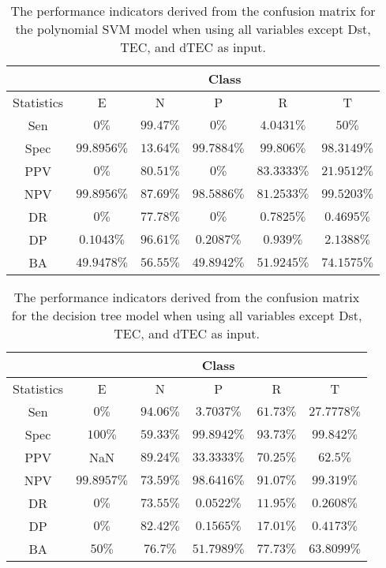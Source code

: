 \begin{table}[!ht]
	\centering
	\begin{tabular}{|c|c|c|c|c|c|}
		\hline
		 & \multicolumn{5}{c|}{Class} \\ \hline
		Statistics & E & N & P & R & T \\ \hline
		Sen & $0\%$ & $99.47\%$ & $0\%$ & $4.0431\%$ & $50\%$ \\ \hline
		Spec & $99.8956\%$ & $13.64\%$ & $99.7884\%$ & $99.806\%$ & $98.3149\%$ \\ \hline
		PPV & $0\%$ & $80.51\%$ & $0\%$ & $83.3333\%$ & $21.9512\%$ \\ \hline
		NPV & $99.8956\%$ & $87.69\%$ & $98.5886\%$ & $81.2533\%$ & $99.5203\%$ \\ \hline
		DR & $0\%$ & $77.78\%$ & $0\%$ & $0.7825\%$ & $0.4695\%$ \\ \hline
		DP & $0.1043\%$ & $96.61\%$ & $0.2087\%$ & $0.939\%$ & $2.1388\%$ \\ \hline
		BA & $49.9478\%$ & $56.55\%$ & $49.8942\%$ & $51.9245\%$ & $74.1575\%$ \\ \hline
	\end{tabular}
	\caption{The performance indicators derived from the confusion matrix for the polynomial SVM model when using all variables except Dst, TEC, and dTEC as input.}
	\label{tab:cs:reverse:noTEC:svmPoly}
\end{table}

\begin{table}[!ht]
	\centering
	\begin{tabular}{|c|c|c|c|c|c|}
		\hline
		 & \multicolumn{5}{c|}{Class} \\ \hline
		Statistics & E & N & P & R & T \\ \hline
		Sen & $0\%$ & $94.06\%$ & $3.7037\%$ & $61.73\%$ & $27.7778\%$ \\ \hline
		Spec & $100\%$ & $59.33\%$ & $99.8942\%$ & $93.73\%$ & $99.842\%$ \\ \hline
		PPV & NaN & $89.24\%$ & $33.3333\%$ & $70.25\%$ & $62.5\%$ \\ \hline
		NPV & $99.8957\%$ & $73.59\%$ & $98.6416\%$ & $91.07\%$ & $99.319\%$ \\ \hline
		DR & $0\%$ & $73.55\%$ & $0.0522\%$ & $11.95\%$ & $0.2608\%$ \\ \hline
		DP & $0\%$ & $82.42\%$ & $0.1565\%$ & $17.01\%$ & $0.4173\%$ \\ \hline
		BA & $50\%$ & $76.7\%$ & $51.7989\%$ & $77.73\%$ & $63.8099\%$ \\ \hline
	\end{tabular}
	\caption{The performance indicators derived from the confusion matrix for the decision tree model when using all variables except Dst, TEC, and dTEC as input.}
	\label{tab:cs:reverse:noTEC:C5.0}
\end{table}

